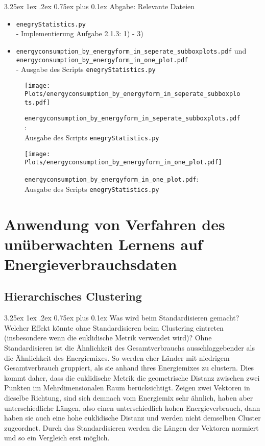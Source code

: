\documentclass[12pt,a4paper]{scrartcl}
\makeatletter
\renewcommand\subparagraph{\@startsection{subparagraph}{5}{\parindent}%
    {3.25ex \@plus1ex \@minus .2ex}%
    {0.75ex plus 0.1ex}%
    {\normalfont\normalsize\bfseries}}
\makeatother
\begin{document}
\subparagraph{Abgabe: Relevante Dateien}
\begin{itemize}
\item \lstinline{enegryStatistics.py} \\- Implementierung Aufgabe 2.1.3: 1) - 3)
\item \lstinline{energyconsumption_by_energyform_in_seperate_subboxplots.pdf} und \\ \lstinline{energyconsumption_by_energyform_in_one_plot.pdf} \\- Ausgabe des Scripts \lstinline{enegryStatistics.py}
\end{itemize}
\newpage
\begin{figure}[!h]
\texttt{[image: Plots/energyconsumption\_by\_energyform\_in\_seperate\_subboxplots.pdf]}
\caption{\lstinline{energyconsumption_by_energyform_in_seperate_subboxplots.pdf}: \\Ausgabe des Scripts \lstinline{enegryStatistics.py}}
\end{figure}

\begin{figure}[!h]
\texttt{[image: Plots/energyconsumption\_by\_energyform\_in\_one\_plot.pdf]}
\caption{\lstinline{energyconsumption_by_energyform_in_one_plot.pdf}: \\Ausgabe des Scripts \lstinline{enegryStatistics.py}}
\end{figure}


\section*{Anwendung von Verfahren des un\"uberwachten Lernens auf Energieverbrauchsdaten}

\subsection*{Hierarchisches Clustering}
\subparagraph{Was wird beim Standardisieren gemacht? Welcher Effekt k\"onnte ohne Standardisieren beim Clustering eintreten (insbesondere wenn die euklidische Metrik verwendet wird)?}
Ohne Standardisieren ist die \"Ahnlichkeit des Gesamtverbrauchs ausschlaggebender als die \"Ahnlichkeit des Energiemixes. So werden eher L\"ander mit niedrigem Gesamtverbrauch gruppiert, als sie anhand ihres Energiemixes zu clustern. Dies kommt daher, dass die euklidische Metrik die geometrische Distanz zwischen zwei Punkten im Mehrdimensionalen Raum ber\"ucksichtigt. Zeigen zwei Vektoren in dieselbe Richtung, sind sich demnach vom Energiemix sehr \"ahnlich, haben aber unterschiedliche L\"angen, also einen unterschiedlich hohen Energieverbrauch, dann haben sie auch eine hohe euklidische Distanz und werden nicht demselben Cluster zugeordnet.
Durch das Standardisieren werden die L\"angen der Vektoren normiert und so ein Vergleich erst m\"oglich.
\end{document}
